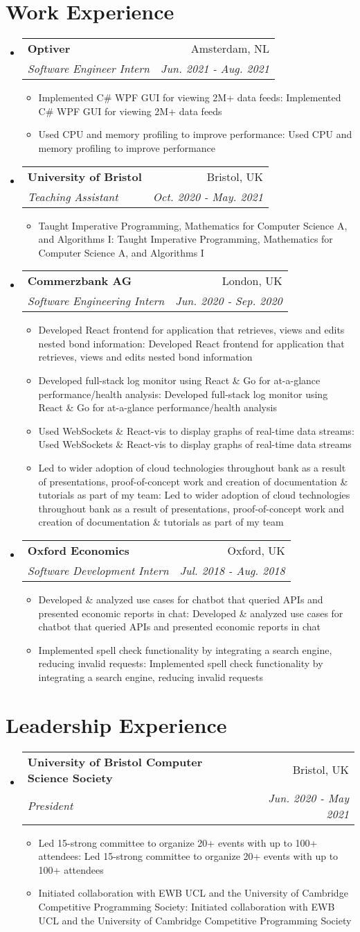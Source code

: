 \documentclass[a4paper,11pt]{article}
\makeatletter
\def \ifempty#1{\def\temp{#1} \ifx\temp\empty }
\newcommand{\resumeItem}[2]{
  \item\small{
  	\ifempty{#1}#2\else\textbf{#1}{: #2 \vspace{-2pt}}\fi
  }
}
\newcommand{\resumeSubheading}[4]{
  \vspace{-1pt}\item
    \begin{tabular*}{0.97\textwidth}{l@{\extracolsep{\fill}}r}
      \textbf{#1} & #2 \\
      \textit{\small#3} & \textit{\small #4} \\
    \end{tabular*}\vspace{-5pt}
}
\newcommand{\resumeSubHeadingListStart}{\begin{itemize}[leftmargin=*]}
\newcommand{\resumeSubHeadingListEnd}{\end{itemize}}
\newcommand{\resumeItemListStart}{\begin{itemize}}
\newcommand{\resumeItemListEnd}{\end{itemize}\vspace{-5pt}}
\makeatother
\begin{document}
\section{Work Experience}
  \resumeSubHeadingListStart
    \resumeSubheading
      {Optiver}{Amsterdam, NL}
      {Software Engineer Intern}{Jun. 2021 - Aug. 2021}
      \resumeItemListStart
      	\resumeItem{}
          {Implemented C\# WPF GUI for viewing 2M+ data feeds}
      	\resumeItem{}
          {Used CPU and memory profiling to improve performance}
      \resumeItemListEnd
    \resumeSubheading
      {University of Bristol}{Bristol, UK}
      {Teaching Assistant}{Oct. 2020 - May. 2021}
      \resumeItemListStart
      	\resumeItem{}
          {Taught Imperative Programming, Mathematics for Computer Science A, and Algorithms I}
      \resumeItemListEnd
    \resumeSubheading
      {Commerzbank AG}{London, UK}
      {Software Engineering Intern}{Jun. 2020 - Sep. 2020}
      \resumeItemListStart
      	\resumeItem{}
          {Developed React frontend for application that retrieves, views and edits nested bond information}
        \resumeItem{}
          {Developed full-stack log monitor using React \& Go for at-a-glance performance/health analysis}
        \resumeItem{}
          {Used WebSockets \& React-vis to display graphs of real-time data streams}
        \resumeItem{}
          {Led to wider adoption of cloud technologies throughout bank as a result of presentations, proof-of-concept work and creation of documentation \& tutorials as part of my team}
      \resumeItemListEnd
    \resumeSubheading
      {Oxford Economics}{Oxford, UK}
      {Software Development Intern}{Jul. 2018 - Aug. 2018}
      \resumeItemListStart
      	\resumeItem{}
          {Developed \& analyzed use cases for chatbot that queried APIs and presented economic reports in chat}
        \resumeItem{}  
          {Implemented spell check functionality by integrating a search 
          engine, reducing invalid requests}
      \resumeItemListEnd
  \resumeSubHeadingListEnd


\section{Leadership Experience}
  \resumeSubHeadingListStart
    \resumeSubheading
      {University of Bristol Computer Science Society}{Bristol, UK}
      {President}{Jun. 2020 - May 2021}
      \resumeItemListStart
        \resumeItem{}
          {Led 15-strong committee to organize 20+ events with up to 100+ attendees}
        \resumeItem{}
          {Initiated collaboration with EWB UCL and the University of Cambridge Competitive Programming Society}
      \resumeItemListEnd
  \resumeSubHeadingListEnd
\end{document}
